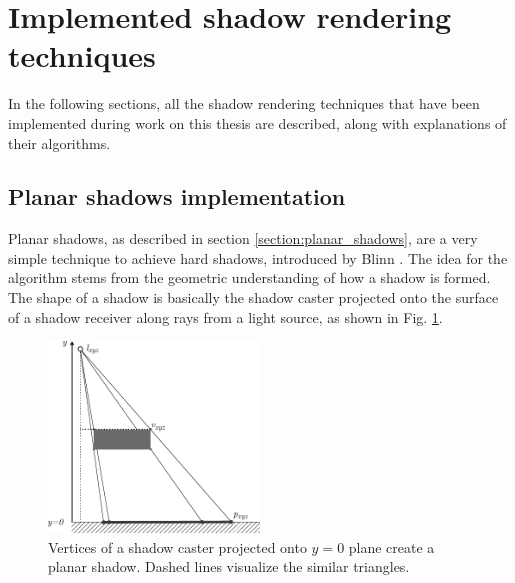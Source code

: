 \section{Implemented shadow rendering techniques}
In the following sections, all the shadow rendering techniques that have been implemented during work on this thesis are described, along with explanations of their algorithms.

\subsection{Planar shadows implementation}
\label{section:planar_shadows_impl}

Planar shadows, as described in section \ref{section:planar_shadows}, are a very simple technique to achieve hard shadows, introduced by Blinn \cite{bib:article:blinn_shadows}. The idea for the algorithm stems from the geometric understanding of how a shadow is formed. The shape of a shadow is basically the shadow caster projected onto the surface of a shadow receiver along rays from a light source, as shown in Fig. \ref{fig:projection_shadow}. 

\begin{figure}[h]
	\centering
	\includegraphics[width=0.5\textwidth]{./graf/projection_shadow.pdf}
	\caption{Vertices of a shadow caster projected onto \(y=0\) plane create a planar shadow. Dashed lines visualize the similar triangles.}
	\label{fig:projection_shadow}
\end{figure}

